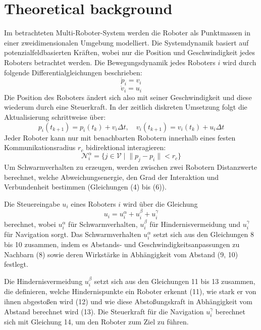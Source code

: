 \documentclass[conference]{IEEEtran}
\begin{document}
\section{Theoretical background}
Im betrachteten Multi-Roboter-System werden die Roboter als Punktmassen in einer zweidimensionalen Umgebung modelliert. Die Systemdynamik basiert auf potenzialfeldbasierten Kräften, wobei nur die Position und Geschwindigkeit jedes Roboters betrachtet werden. Die Bewegungsdynamik jedes Roboters $i$ wird durch folgende Differentialgleichungen beschrieben:
\begin{equation}
    \dot{p}_i = v_i
\end{equation}
\begin{equation}
    \dot{v}_i = u_i
\end{equation}
Die Position des Roboters ändert sich also mit seiner Geschwindigkeit und diese wiederum durch eine Steuerkraft.
In der zeitlich diskreten Umsetzung folgt die Aktualisierung schrittweise über:
\begin{equation}
p_i(t_{k+1}) = p_i(t_k) + v_i \Delta t, \quad v_i(t_{k+1}) = v_i(t_k) + u_i \Delta t
\end{equation}
Jeder Roboter kann nur mit benachbarten Robotern innerhalb eines festen Kommunikationsradius $r_c$ bidirektional interagieren:
\begin{equation}
\mathcal{N}_i^\alpha = \{ j \in \mathcal{V} \; | \; \| p_j - p_i \| < r_c \}
\end{equation}
Um Schwarmverhalten zu erzeugen, werden zwischen zwei Robotern Distanzwerte berechnet, welche Abweichungsenergie, den Grad der Interaktion und Verbundenheit bestimmen (Gleichungen (4) bis (6)).

Die Steuereingabe $u_i$ eines Roboters $i$ wird über die Gleichung
\begin{equation}
u_i = u_i^\alpha + u_i^\beta + u_i^\gamma
\end{equation}
berechnet, wobei $u_i^\alpha$ für Schwarmverhalten, $u_i^\beta$ für Hindernisvermeidung und $u_i^\gamma$ für Navigation sorgt. Das Schwarmverhalten $u_i^\alpha$ setzt sich aus den Gleichungen 8 bis 10 zusammen, indem es Abstands- und Geschwindigkeitsanpassungen zu Nachbarn (8) sowie deren Wirkstärke in Abhängigkeit vom Abstand (9, 10) festlegt. 

Die Hindernisvermeidung $u_i^\beta$ setzt sich aus den Gleichungen 11 bis 13 zusammen, die definieren, welche Hindernispunkte ein Roboter erkennt (11), wie stark er von ihnen abgestoßen wird (12) und wie diese Abstoßungskraft in Abhängigkeit vom Abstand berechnet wird (13). Die Steuerkraft für die Navigation $u_i^\gamma$ berechnet sich mit Gleichung 14, um den Roboter zum Ziel zu führen.
\end{document}
